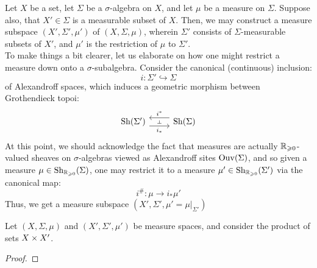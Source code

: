         \begin{remark}
            Let $X$ be a set, let $\Sigma$ be a $\sigma$-algebra on $X$, and let $\mu$ be a measure on $\Sigma$. Suppose also, that $X' \in \Sigma$ is a measurable subset of $X$. Then, we may construct a measure subspace $(X', \Sigma', \mu')$ of $(X, \Sigma, \mu)$, wherein $\Sigma'$ consists of $\Sigma$-measurable subsets of $X'$, and $\mu'$ is the restriction of $\mu$ to $\Sigma'$.
            \\
            To make things a bit clearer, let us elaborate on how one might restrict a measure down onto a $\sigma$-subalgebra. Consider the canonical (continuous) inclusion:
                $$i: \Sigma' \hookrightarrow \Sigma$$
            of Alexandroff spaces, which induces a geometric morphism between Grothendieck topoi:
                $$
                    \begin{tikzcd}
                        {\Sh(\Sigma')} & {\Sh(\Sigma)}
                        \arrow[""{name=0, anchor=center, inner sep=0}, "{i_*}"', shift right=2, from=1-1, to=1-2]
                        \arrow[""{name=1, anchor=center, inner sep=0}, "{i^*}"', shift right=2, from=1-2, to=1-1]
                        \arrow["\dashv"{anchor=center, rotate=-90}, draw=none, from=1, to=0]
                    \end{tikzcd}
                $$
            At this point, we should acknowledge the fact that measures are actually $\mathbb{R}_{\geqslant 0}$-valued sheaves on $\sigma$-algebras viewed as Alexandroff sites $\mathrm{Ouv}(\Sigma)$, and so given a measure $\mu \in \mathrm{Sh}_{\mathbb{R}_{\geqslant 0}}(\Sigma)$, one may restrict it to a measure $\mu' \in \mathrm{Sh}_{\mathbb{R}_{\geqslant 0}}(\Sigma')$ via the canonical map:
                $$i^{\#}: \mu \to i_*\mu'$$
            Thus, we get a measure subspace $(X', \Sigma', \mu' = \mu \rvert_{\Sigma'})$
        \end{remark}
        
        Let $(X, \Sigma, \mu)$ and $(X', \Sigma', \mu')$ be measure spaces, and consider the product of sets $X \x X'$. 
        \begin{theorem}[Fubini] \label{theorem: fubini}
            
        \end{theorem}
            \begin{proof}
                
            \end{proof}

